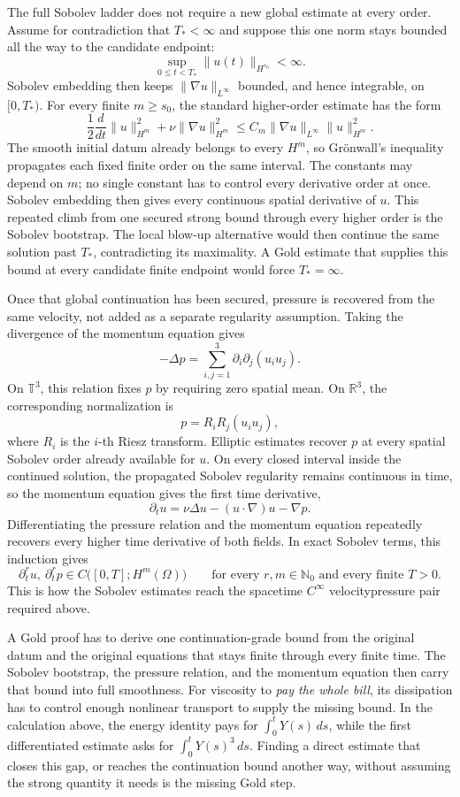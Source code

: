 The full Sobolev ladder does not require a new global estimate at every order.
Assume for contradiction that \(T_*<\infty\) and suppose this one norm stays bounded all the way to the candidate endpoint:
\[
  \sup_{0\leq t<T_*}\lVert u(t)\rVert_{H^{s_0}}<\infty.
\]
Sobolev embedding then keeps \(\lVert\nabla u\rVert_{L^\infty}\) bounded, and hence integrable, on \([0,T_*)\).
For every finite \(m\geq s_0\), the standard higher-order estimate has the form
\[
  \frac12\frac{d}{dt}\lVert u\rVert_{H^m}^2
  +
  \nu\lVert\nabla u\rVert_{H^m}^2
  \leq
  C_m\lVert\nabla u\rVert_{L^\infty}\lVert u\rVert_{H^m}^2.
\]
The smooth initial datum already belongs to every \(H^m\), so Grönwall's inequality propagates each fixed finite order on the same interval.
The constants may depend on \(m\); no single constant has to control every derivative order at once.
Sobolev embedding then gives every continuous spatial derivative of \(u\).
This repeated climb from one secured strong bound through every higher order is the Sobolev bootstrap.
The local blow-up alternative would then continue the same solution past \(T_*\), contradicting its maximality.
A Gold estimate that supplies this bound at every candidate finite endpoint would force \(T_*=\infty\).

Once that global continuation has been secured, pressure is recovered from the same velocity, not added as a separate regularity assumption.
Taking the divergence of the momentum equation gives
\[
  -\Delta p
  =
  \sum_{i,j=1}^3\partial_i\partial_j(u_i u_j).
\]
On \(\mathbb T^3\), this relation fixes \(p\) by requiring zero spatial mean.
On \(\mathbb R^3\), the corresponding normalization is
\[
  p=R_iR_j(u_i u_j),
\]
where \(R_i\) is the \(i\)-th Riesz transform.
Elliptic estimates recover \(p\) at every spatial Sobolev order already available for \(u\).
On every closed interval inside the continued solution, the propagated Sobolev regularity remains continuous in time, so the momentum equation gives the first time derivative,
\[
  \partial_tu
  =
  \nu\Delta u
  -(u\cdot\nabla)u
  -\nabla p.
\]
Differentiating the pressure relation and the momentum equation repeatedly recovers every higher time derivative of both fields.
In exact Sobolev terms, this induction gives
\[
  \partial_t^r u,\ \partial_t^r p
  \in
  C\bigl([0,T];H^m(\Omega)\bigr)
  \qquad
  \text{for every }r,m\in\mathbb N_0
  \text{ and every finite }T>0.
\]
This is how the Sobolev estimates reach the spacetime \(C^\infty\) velocity\textendash pressure pair required above.

A Gold proof has to derive one continuation-grade bound from the original datum and the original equations that stays finite through every finite time.
The Sobolev bootstrap, the pressure relation, and the momentum equation then carry that bound into full smoothness.
For viscosity to \emph{pay the whole bill}, its dissipation has to control enough nonlinear transport to supply the missing bound.
In the calculation above, the energy identity pays for \(\int_0^tY(s)\,ds\), while the first differentiated estimate asks for \(\int_0^tY(s)^3\,ds\).
Finding a direct estimate that closes this gap, or reaches the continuation bound another way, without assuming the strong quantity it needs is the missing Gold step.

